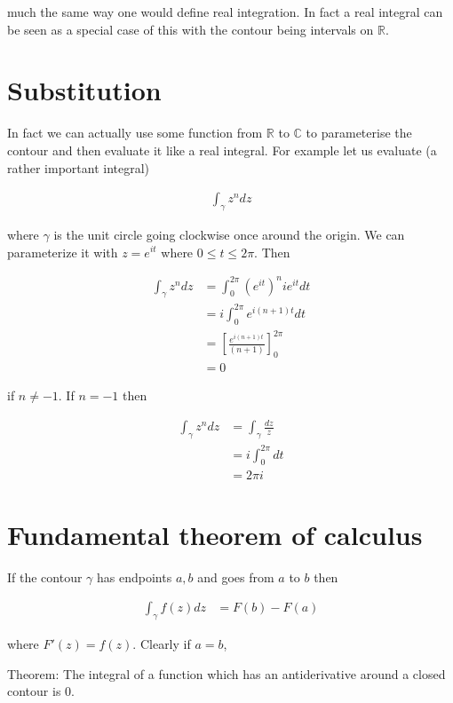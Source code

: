 \documentclass{article}
\begin{document}
much the same way one would define real integration. In fact a real integral can be seen as a special case of this with the contour being intervals on $\mathbb{R}$.

\section{Substitution}

In fact we can actually use some function from $\mathbb{R}$ to $\mathbb{C}$ to parameterise the contour and then evaluate it like a real integral. For example let us evaluate (a rather important integral)

\begin{align}
\int_\gamma z^n dz
\end{align}

where $\gamma$ is the unit circle going clockwise once around the origin. We can parameterize it with $z=e^{it}$ where $0 \leq t \leq 2\pi$. Then

\begin{align}
\int_\gamma z^n dz &= \int_0^{2\pi} (e^{it})^nie^{it} dt \\
                   &= i \int_0^{2\pi} e^{i(n+1)t} dt \\
                   &= \left[\frac{e^{i(n+1)t}}{(n+1)}\right]_0^{2\pi} \\
                   &= 0
\end{align}

if $n \neq -1$. If $n=-1$ then

\begin{align}
\int_\gamma z^n dz &= \int_\gamma \frac{dz}{z} \\
                   &= i \int_0^{2\pi} dt \\
                   &= 2\pi i
\end{align}

\section{Fundamental theorem of calculus}

If the contour $\gamma$ has endpoints $a,b$ and goes from $a$ to $b$ then

\begin{align}
\int_\gamma f(z) dz &= F(b) - F(a)
\end{align}

where $F'(z) = f(z)$. Clearly if $a=b$,

Theorem: The integral of a function which has an antiderivative around a closed contour is 0.
\end{document}
